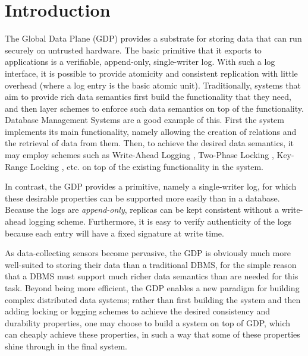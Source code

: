 \documentclass{acm_proc_article-sp}
\begin{document}
\section{Introduction}
The Global Data Plane (GDP) \cite{GDP} provides a substrate for storing data that can run securely on untrusted hardware. The basic primitive that it exports to applications is a verifiable, append-only, single-writer log. With such a log interface, it is possible to provide atomicity and consistent replication with little overhead (where a log entry is the basic atomic unit). Traditionally, systems that aim to provide rich data semantics first build the functionality that they need, and then layer schemes to enforce such data semantics on top of the functionality. Database Management Systems are a good example of this. First the system implements its main functionality, namely allowing the creation of relations and the retrieval of data from them. Then, to achieve the desired data semantics, it may employ schemes such as Write-Ahead Logging \cite{ARIES}, Two-Phase Locking \cite{CCRDBS}, Key-Range Locking \cite{KRLSIC}, etc. on top of the existing functionality in the system.

In contrast, the GDP provides a primitive, namely a single-writer log, for which these desirable properties can be supported more easily than in a database. Because the logs are \emph{append-only}, replicas can be kept consistent without a write-ahead logging scheme. Furthermore, it is easy to verify authenticity of the logs because each entry will have a fixed signature at write time.

As data-collecting sensors become pervasive, the GDP is obviously much more well-suited to storing their data than a traditional DBMS, for the simple reason that a DBMS must support much richer data semantics than are needed for this task. Beyond being more efficient, the GDP enables a new paradigm for building complex distributed data systems; rather than first building the system and then adding locking or logging schemes to achieve the desired consistency and durability properties, one may choose to build a system on top of GDP, which can cheaply achieve these properties, in such a way that some of these properties shine through in the final system.
\end{document}
